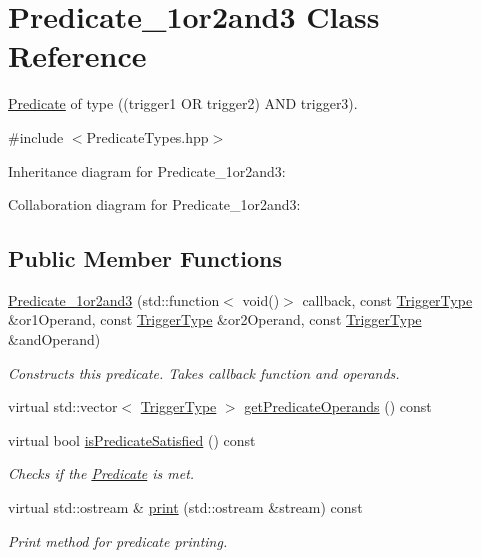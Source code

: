 \hypertarget{classPredicate__1or2and3}{}\section{Predicate\+\_\+1or2and3 Class Reference}
\label{classPredicate__1or2and3}


\hyperlink{classPredicate}{Predicate} of type ((trigger1 OR trigger2) A\+ND trigger3).  




{\ttfamily \#include $<$Predicate\+Types.\+hpp$>$}



Inheritance diagram for Predicate\+\_\+1or2and3\+:


Collaboration diagram for Predicate\+\_\+1or2and3\+:
\subsection*{Public Member Functions}
\begin{DoxyCompactItemize}
\item 
\hyperlink{classPredicate__1or2and3_a6dd5264bc2759b2a799763ee75c81679}{Predicate\+\_\+1or2and3} (std\+::function$<$ void()$>$ callback, const \hyperlink{structTriggerType}{Trigger\+Type} \&or1\+Operand, const \hyperlink{structTriggerType}{Trigger\+Type} \&or2\+Operand, const \hyperlink{structTriggerType}{Trigger\+Type} \&and\+Operand)\hypertarget{classPredicate__1or2and3_a6dd5264bc2759b2a799763ee75c81679}{}\label{classPredicate__1or2and3_a6dd5264bc2759b2a799763ee75c81679}

\begin{DoxyCompactList}\small\item\em Constructs this predicate. Takes callback function and operands. \end{DoxyCompactList}\item 
virtual std\+::vector$<$ \hyperlink{structTriggerType}{Trigger\+Type} $>$ \hyperlink{classPredicate__1or2and3_ada2177d1a46e192c2ba2429bcb7ed8e5}{get\+Predicate\+Operands} () const 
\item 
virtual bool \hyperlink{classPredicate__1or2and3_aae17c4d95f403c995a56c11e8a31bfb8}{is\+Predicate\+Satisfied} () const \hypertarget{classPredicate__1or2and3_aae17c4d95f403c995a56c11e8a31bfb8}{}\label{classPredicate__1or2and3_aae17c4d95f403c995a56c11e8a31bfb8}

\begin{DoxyCompactList}\small\item\em Checks if the \hyperlink{classPredicate}{Predicate} is met. \end{DoxyCompactList}\item 
virtual std\+::ostream \& \hyperlink{classPredicate__1or2and3_a67d3fac79cbfb0eb9f2a7a255426c1a8}{print} (std\+::ostream \&stream) const \hypertarget{classPredicate__1or2and3_a67d3fac79cbfb0eb9f2a7a255426c1a8}{}\label{classPredicate__1or2and3_a67d3fac79cbfb0eb9f2a7a255426c1a8}

\begin{DoxyCompactList}\small\item\em Print method for predicate printing. \end{DoxyCompactList}\end{DoxyCompactItemize}
